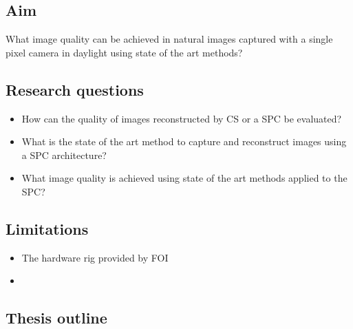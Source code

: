 \subsection{Aim} 
What image quality can be achieved in natural images captured with a single pixel camera in daylight using state of the art methods?  


\subsection{Research questions} 
\label{sec:RQ}
\begin{itemize}
    \item How can the quality of images reconstructed by CS or a SPC be evaluated?
    \item What is the state of the art method to capture and reconstruct images using a SPC architecture?
    \item What image quality is achieved using state of the art methods applied to the SPC?
\end{itemize}


\subsection{Limitations}
\begin{itemize}
    \item The hardware rig provided by FOI
    \item 
\end{itemize}



\subsection{Thesis outline}
